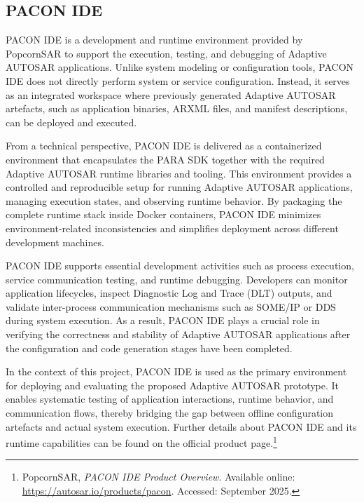 \subsection{PACON IDE}

PACON IDE is a development and runtime environment provided by PopcornSAR to support the execution, testing, and debugging of Adaptive AUTOSAR applications. Unlike system modeling or configuration tools, PACON IDE does not directly perform system or service configuration. Instead, it serves as an integrated workspace where previously generated Adaptive AUTOSAR artefacts, such as application binaries, ARXML files, and manifest descriptions, can be deployed and executed.

From a technical perspective, PACON IDE is delivered as a containerized environment that encapsulates the PARA SDK together with the required Adaptive AUTOSAR runtime libraries and tooling. This environment provides a controlled and reproducible setup for running Adaptive AUTOSAR applications, managing execution states, and observing runtime behavior. By packaging the complete runtime stack inside Docker containers, PACON IDE minimizes environment-related inconsistencies and simplifies deployment across different development machines.

PACON IDE supports essential development activities such as process execution, service communication testing, and runtime debugging. Developers can monitor application lifecycles, inspect Diagnostic Log and Trace (DLT) outputs, and validate inter-process communication mechanisms such as SOME/IP or DDS during system execution. As a result, PACON IDE plays a crucial role in verifying the correctness and stability of Adaptive AUTOSAR applications after the configuration and code generation stages have been completed.

In the context of this project, PACON IDE is used as the primary environment for deploying and evaluating the proposed Adaptive AUTOSAR prototype. It enables systematic testing of application interactions, runtime behavior, and communication flows, thereby bridging the gap between offline configuration artefacts and actual system execution. Further details about PACON IDE and its runtime capabilities can be found on the official product page.\footnote{PopcornSAR, \textit{PACON IDE Product Overview}. Available online: \url{https://autosar.io/products/pacon}. Accessed: September 2025.}


